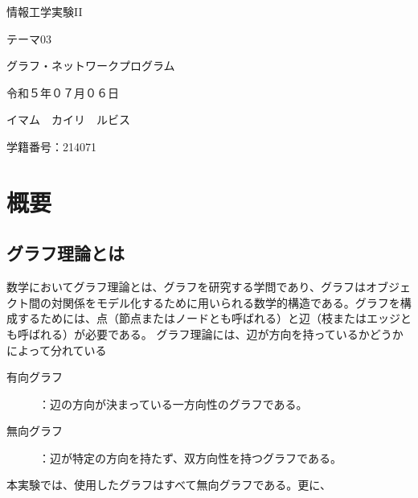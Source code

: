 \documentclass[a4j, titlepage]{jarticle}
\begin{document}
  \begin{center}
  \huge 情報工学実験II\par
  \vspace{15mm}
  \huge テーマ03 \par
  \huge グラフ・ネットワークプログラム \par
  \vspace{15mm}
  \vspace{20mm}
  \vspace{100mm}
  \Large 令和５年０７月０６日 \par
  \vspace{15mm}
  \Large イマム　カイリ　ルビス \par
  \vspace{10mm}
  \Large 学籍番号：214071\par
  \vspace{10mm}
\end{center}
\clearpage

\tableofcontents
\clearpage

\section{概要}
    \subsection{グラフ理論とは}
        数学においてグラフ理論とは、グラフを研究する学問であり、グラフはオブジェクト間の対関係をモデル化するために用いられる数学的構造である。グラフを構成するためには、点（節点またはノードとも呼ばれる）と辺（枝またはエッジとも呼ばれる）が必要である\cite{bib:wikigraph}。 
        グラフ理論には、辺が方向を持っているかどうかによって分れている
        \begin{description}
            \item[有向グラフ]：辺の方向が決まっている一方向性のグラフである。
            \item[無向グラフ]：辺が特定の方向を持たず、双方向性を持つグラフである。
        \end{description}
        本実験では、使用したグラフはすべて無向グラフである。更に、
\end{document}
